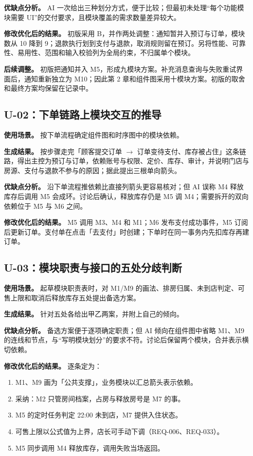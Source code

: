 \textbf{优缺点分析。} AI 一次给出三种划分方式，便于比较；但最初未处理“每个功能模块需要 UI”的交付要求，且模块覆盖的需求数量差异较大。

\textbf{修改优化后的结果。} 初版采用 B，并作两处调整：通知暂并入预订与订单，模块数从 10 降到 9；退款执行划到支付与退款，取消规则留在预订。另将性能、可靠性、易用性、范围和输入校验列为全局约束，不归属单个模块。

\textbf{后续调整。} 初版把通知并入 M5，形成九模块方案。补充消息查询与失败重试界面后，通知重新独立为 M10；因此第 2 章和组件图采用十模块方案。初版的取舍和最终方案均保留在记录中。

\subsection{U-02：下单链路上模块交互的推导}

\textbf{使用场景。} 按下单流程确定组件图和时序图中的模块依赖。

\textbf{生成结果。} 按步骤走完「顾客提交订单 $\rightarrow$ 订单变待支付、库存被占住」这条链路，得出主控为预订与订单，依赖账号与权限、定价、库存、审计，并说明门店与房源、支付与退款不参与的原因；据此提出三根单向箭头。

\textbf{优缺点分析。} 沿下单流程推依赖比直接列箭头更容易核对；但 AI 误称 M4 释放库存后调用 M5 会成环。讨论后确认，释放库存仍是 M5 调 M4；需要拆开的双向依赖位于 M5 与 M6 之间。

\textbf{修改优化后的结果。} M5 调用 M3、M4 和 M1；M6 发布支付成功事件，M5 订阅后更新订单。支付单在点击「去支付」时创建；下单时在同一事务内先扣库存再建订单。

\subsection{U-03：模块职责与接口的五处分歧判断}

\textbf{使用场景。} 起草模块职责表时，对 M1/M9 的画法、排房归属、未到店判定、可售上限和取消后释放库存五处提出备选方案。

\textbf{生成结果。} 针对五处各给出甲乙两案，并附上自己的倾向。

\textbf{优缺点分析。} 备选方案便于逐项确定职责；但 AI 倾向在组件图中省略 M1、M9 的连线和节点，与“写明模块划分”的要求不符。讨论后保留两个模块，合并表示横切依赖。

\textbf{修改优化后的结果。} 逐条定为：

\begin{enumerate}[leftmargin=3.2em]
  \item M1、M9 画为「公共支撑」，业务模块以汇总箭头表示依赖。
  \item 采纳：M2 只管房间档案，占房与释放房号是 M7 的事。
  \item M5 的定时任务判定 22:00 未到店，M7 提供入住状态。
  \item 可售上限以公式值为上界，店长可手动下调（REQ-006、REQ-033）。
  \item M5 同步调用 M4 释放库存，调用失败当场返回。
\end{enumerate}

